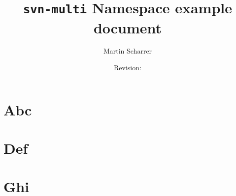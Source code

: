 \documentclass[a4paper]{scrbook}
\title{\texttt{svn-multi} Namespace example document}
\author{Martin Scharrer}
\date{Revision: \svnrev}
\def\svnnamespace#1{}
\begin{document}
\maketitle
\tableofcontents

\part{Abc}
\svnnamespace{abc}




\part{Def}
\svnnamespace{def}



\part{Ghi}
\svnnamespace{ghi}







\end{document}
